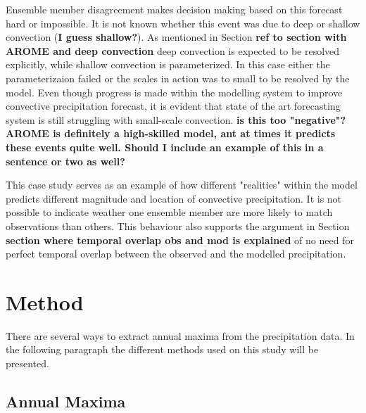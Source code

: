 Ensemble member disagreement makes decision making based on this forecast hard or impossible. It is not known whether this event was due to deep or shallow convection (\textbf{I guess shallow?}). As mentioned in Section \textbf{ref to section with AROME and deep convection} deep convection is expected to be resolved explicitly, while shallow convection is parameterized. In this case either the parameterizaion failed or the scales in action was to small to be resolved by the model. Even though progress is made within the modelling system to improve convective precipitation forecast, it is evident that state of the art forecasting system is still struggling with small-scale convection. \textbf{is this too "negative"? AROME is definitely a high-skilled model, ant at times it predicts these events quite well. Should I include an example of this in a sentence or two as well?}

This case study serves as an example of how different "realities" within the model predicts different magnitude and location of convective precipitation. It is not possible to indicate weather one ensemble member are more likely to match observations than others. This behaviour also supports the argument in Section \textbf{section where temporal overlap obs and mod is explained} of no need for perfect temporal overlap between the observed and the modelled precipitation.       

\section{Method}

There are several ways to extract annual maxima from the precipitation data. In the following paragraph the different methods used on this study will be presented.  
\subsection{Annual Maxima}

